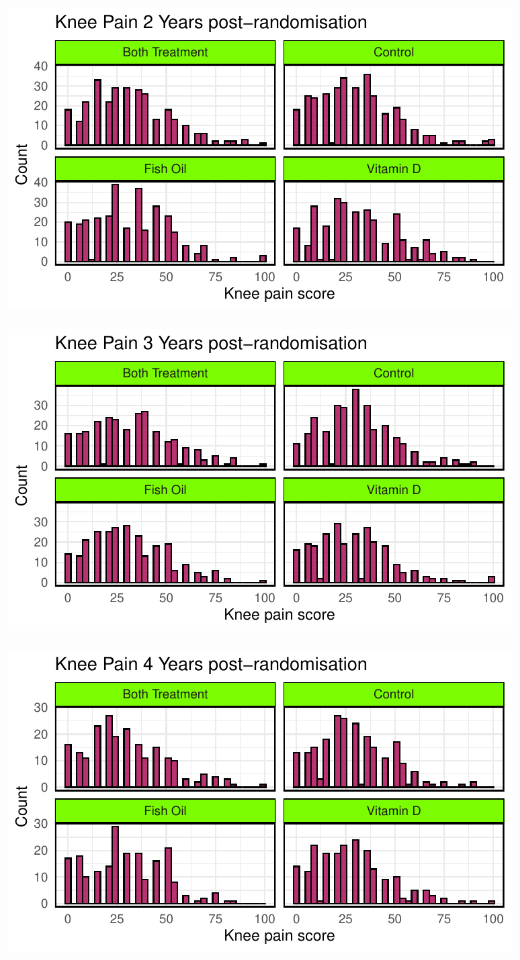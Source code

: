 \documentclass{article}
\begin{document}
\begin{center}\includegraphics{Final_Report_files/figure-latex/unnamed-chunk-16-1} \end{center}

\begin{center}\includegraphics{Final_Report_files/figure-latex/unnamed-chunk-17-1} \end{center}

\begin{center}\includegraphics{Final_Report_files/figure-latex/unnamed-chunk-18-1} \end{center}
\end{document}
